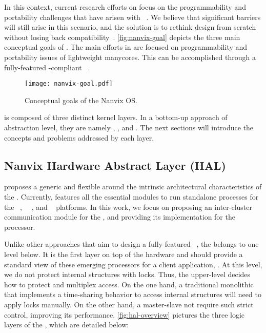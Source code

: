 	In this context, current research efforts on \nanvixos focus on the
	programmability and portability	challenges that have arisen with
	\lightweight \manycores~\cite{christgau2017, gamell2012, serres2011}.
	We believe that significant barriers will still arise in this scenario, and
	the solution is to rethink \os design from scratch without losing back
	compatibility~\cite{penna:compas19, penna2019}.
	\autoref{fig:nanvix-goal} depicts the three main conceptual goals of \nanvixos.
	The main efforts in \nanvixos are focused on programmability and portability
	issues of lightweight manycores. This can be accomplished through a fully-featured
	\posix-compliant \os~\cite{penna:compas19}.

	\begin{figure}[!tb]
		\centering%
		\caption{Conceptual goals of the Nanvix OS.}%
		\label{fig:nanvix-goal}%
		\texttt{[image: nanvix-goal.pdf]}%
	\end{figure}

	\nanvixos is composed of three distinct kernel layers.
	In a bottom-up approach of abstraction level, they are namely \textit{\nanvixhal},
	\textit{\nanvixmicrokernel}, and \textit{\nanvixmultikernel}.
	The next sections will introduce the concepts and problems addressed by
	each layer.

	\subsection{Nanvix Hardware Abstract Layer (HAL)}
	\label{sec.hal}

		\nanvixos proposes a generic and flexible \hal around the
		intrinsic architectural characteristics of the \lightweight \manycores.
		Currently, \nanvixhal features all the essential modules to run standalone
		processes for the \mppa~\cite{DeDinechin2013-1}, \optimsoc~~\cite{Wallentowitz2013},
		and \hero~\cite{Kurth2017} platforms.
		In this work, we focus on proposing an inter-cluster communication module
		for the \nanvixhal, and providing its implementation for the \mppa processor.

		Unlike other approaches that aim to design a fully-featured \os~\cite{Baumann2009,kluge2014,nightingale2009,rhoden2011},
		the \nanvixhal belongs to one level below.
		It is the first layer on top of the hardware and should provide a standard
		view of these emerging processors for a client application, \eg \os.
		At this level, we do not protect internal structures with locks.
		Thus, the upper-level decides how to protect and multiplex \hal access.
		On the one hand, a traditional monolithic \os that implements a time-sharing
		behavior to access internal structures will need to apply locks manually.
		On the other hand, a master-slave \os not require such strict control,
		improving its performance.
		\autoref{fig:hal-overview} pictures the three logic layers of the \nanvixhal, which are
		detailed below:


